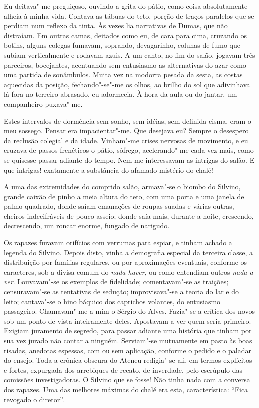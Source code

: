 Eu deitava"-me
preguiçoso, ouvindo a grita do pátio, como coisa absolutamente alheia à
minha vida. Contava as tábuas do teto, porção de traços paralelos que
se perdiam num reflexo da tinta. Às vezes lia narrativas de Dumas, que
não distraíam. Em outras camas, deitados como eu, de cara para cima,
cruzando os botins, alguns colegas fumavam, soprando, devagarinho,
colunas de fumo que subiam verticalmente e rodavam azuis. A um canto,
no fim do salão, jogavam três parceiros, bocejantes, acentuando sem
entusiasmo as alternativas do azar como uma partida de sonâmbulos.
Muita vez na modorra pesada da sesta, as costas aquecidas da posição,
fechando"-se"-me os olhos, ao brilho do sol que adivinhava lá fora no
terreiro abrasado, eu adormecia. À hora da aula ou do jantar, um
companheiro puxava"-me. 

Estes intervalos de dormência sem sonho, sem
idéias, sem definida cisma, eram o meu sossego. Pensar era
impacientar"-me. Que desejava eu? Sempre o desespero da reclusão
colegial e da idade. Vinham"-me crises nervosas de movimento, e eu
cruzava de passos frenéticos o pátio, sôfrego, acelerando"-me cada vez
mais, como se quisesse passar adiante do tempo. Nem me interessavam as
intrigas do salão. E que intrigas! exatamente a substância do afamado
mistério do chalé! 

A uma das extremidades do comprido salão,
armava"-se o biombo do Silvino, grande caixão de pinho a meia altura
do teto, com uma porta e uma janela de palmo quadrado, donde saíam
emanações de roupas suadas e várias outras, cheiros indecifráveis de
pouco asseio; donde saía mais, durante a noite, crescendo, decrescendo,
um roncar enorme, fungado de narigudo. 

Os rapazes furavam orifícios com
verrumas para espiar, e tinham achado a legenda do Silvino. Depois
disto, vinha a demografia especial da terceira classe, a distribuição
por famílias regulares, ou por aproximações eventuais, conforme os
caracteres, sob a divisa comum do \textit{nada haver}, ou como entendiam outros
\textit{nada a ver}. Louvavam"-se os exemplos de fidelidade; comentavam"-se as
traições; censuravam"-se as tentativas de sedução; improvisava"-se a
teoria do lar e do leito; cantava"-se o hino báquico dos caprichos
volantes, do entusiasmo passageiro. Chamavam"-me a mim o Sérgio do
Alves. Fazia"-se a crítica dos novos sob um ponto de vista
inteiramente deles. Apostavam a ver quem seria primeiro. Exigiam
juramento de segredo, para passar adiante uma história que tinham por
sua vez jurado não contar a ninguém. Serviam"-se mutuamente em pasto
às boas risadas, anedotas espessas, com ou sem aplicação, conforme o
pedido e o paladar do ensejo. Toda a crônica obscura do Ateneu
redigia"-se ali, em termos explícitos e fortes, expurgada dos
arrebiques de recato, de inverdade, pelo escrúpulo das comissões
investigadoras. O Silvino que se fosse! Não tinha nada com a conversa
dos rapazes. Uma das melhores máximas do chalé era esta, característica: 
``Fica revogado o diretor''. 


